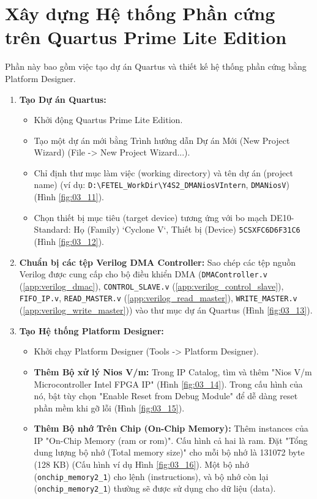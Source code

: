 \FloatBarrier %

\section{Xây dựng Hệ thống Phần cứng trên Quartus Prime Lite Edition}
\label{sec:build_hardware}

Phần này bao gồm việc tạo dự án Quartus và thiết kế hệ thống phần cứng bằng Platform Designer.

\begin{enumerate}
    \item \textbf{Tạo Dự án Quartus:}
    \begin{itemize}
        \item Khởi động Quartus Prime Lite Edition.
        \item Tạo một dự án mới bằng Trình hướng dẫn Dự án Mới (New Project Wizard) (File -> New Project Wizard...).
        \item Chỉ định thư mục làm việc (working directory) và tên dự án (project name) (ví dụ: \texttt{D:\textbackslash FETEL\_WorkDir\textbackslash Y4S2\_DMANiosVIntern}, \texttt{DMANiosV}) (Hình \ref{fig:03_11}).
        \item Chọn thiết bị mục tiêu (target device) tương ứng với bo mạch DE10-Standard: Họ (Family) `Cyclone V`, Thiết bị (Device) \texttt{5CSXFC6D6F31C6} (Hình \ref{fig:03_12}).
    \end{itemize}
    \item \textbf{Chuẩn bị các tệp Verilog DMA Controller:} Sao chép các tệp nguồn Verilog được cung cấp cho bộ điều khiển DMA (\texttt{DMAController.v} (\ref{app:verilog_dmac}), \texttt{CONTROL\_SLAVE.v} (\ref{app:verilog_control_slave}), \texttt{FIFO\_IP.v}, \texttt{READ\_MASTER.v} (\ref{app:verilog_read_master}), \texttt{WRITE\_MASTER.v} (\ref{app:verilog_write_master})) vào thư mục dự án Quartus (Hình \ref{fig:03_13}).
    \item \textbf{Tạo Hệ thống Platform Designer:}
    \begin{itemize}
        \item Khởi chạy Platform Designer (Tools -> Platform Designer).
        \item \textbf{Thêm Bộ xử lý Nios V/m:} Trong IP Catalog, tìm và thêm "Nios V/m Microcontroller Intel FPGA IP" (Hình \ref{fig:03_14}). Trong cấu hình của nó, bật tùy chọn  "Enable Reset from Debug Module" để dễ dàng reset phần mềm khi gỡ lỗi (Hình \ref{fig:03_15}).
        \item \textbf{Thêm Bộ nhớ Trên Chip (On-Chip Memory):} Thêm instances của IP "On-Chip Memory (\acrshort{ram} or \acrshort{rom})". Cấu hình cả hai là \acrshort{ram}. Đặt "Tổng dung lượng bộ nhớ (Total memory size)" cho mỗi bộ nhớ là 131072 byte (128 KB) (Cấu hình ví dụ Hình \ref{fig:03_16}). Một bộ nhớ (\texttt{onchip\_memory2\_1}) cho lệnh (instructions), và bộ nhớ còn lại (\texttt{onchip\_memory2\_1}) thường sẽ được sử dụng cho dữ liệu (data).

\end{itemize}
\end{enumerate}
